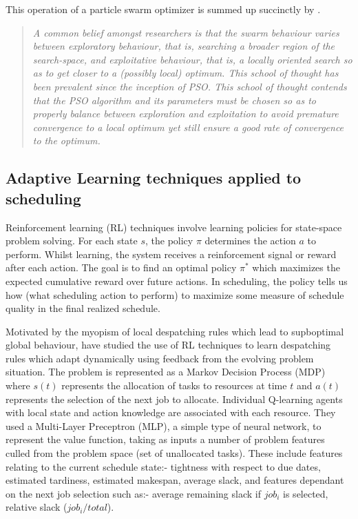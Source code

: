 This operation of a particle swarm optimizer is summed up succinctly by \citet{kennedy97particle}.
\begin{quote}
\emph{A common belief amongst researchers is that the swarm behaviour varies between exploratory behaviour, that is, searching a broader region of the search-space, and exploitative behaviour, that is, a locally oriented search so as to get closer to a (possibly local) optimum. This school of thought has been prevalent since the inception of PSO. This school of thought contends that the PSO algorithm and its parameters must be chosen so as to properly balance between exploration and exploitation to avoid premature convergence to a local optimum yet still ensure a good rate of convergence to the optimum.}
\end{quote}



%
%
\subsection{Adaptive Learning techniques applied to scheduling}
\label{sub:review_adaptive}


Reinforcement learning (RL) techniques involve learning policies for state-space problem solving. For each state $s$, the policy $\pi$ determines the action $a$ to perform. Whilst learning, the system receives a reinforcement signal or reward after each action. The goal is to find an optimal policy $\pi^*$ which maximizes the expected cumulative reward over future actions. In scheduling, the policy tells us how (what scheduling action to perform) to maximize some measure of schedule quality in the final realized schedule.

Motivated by the myopism of local despatching rules which lead to supboptimal global behaviour, \citet{riedmiller99neural} have studied the use of RL techniques to learn despatching rules which adapt dynamically using feedback from the evolving problem situation. The problem is represented as a Markov Decision Process (MDP) where $s(t)$ represents the allocation of tasks to resources at time $t$ and $a(t)$ represents the selection of the next job to allocate. Individual Q-learning agents with local state and action knowledge are associated with each resource. They used a Multi-Layer Preceptron (MLP), a simple type of neural network, to represent the value function, taking as inputs a number of problem features culled from the problem space (set of unallocated tasks). These include features relating to the current schedule state:- tightness with respect to due dates, estimated tardiness, estimated makespan, average slack, and features dependant on the next job selection such as:- average remaining slack if $job_i$ is selected, relative slack ($job_i/total$).

